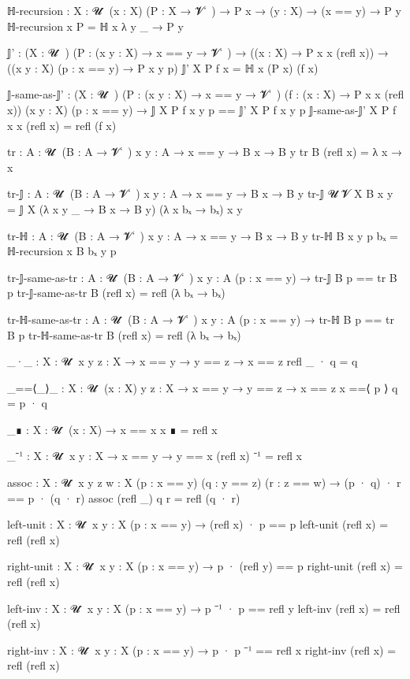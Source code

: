 ℍ-recursion : {X : 𝓤 ̇ } (x : X) (P : X → 𝓥 ̇ )
            → P x
            → (y : X) 
            → (x == y)
            → P y
ℍ-recursion x P = ℍ x λ y _ → P y 

𝕁' : (X : 𝓤 ̇ ) (P : (x y : X) → x == y → 𝓥 ̇ )
   → ((x : X) → P x x (refl x))
   → ((x y : X) (p : x == y) → P x y p) 
𝕁' X P f x = ℍ x (P x) (f x)

𝕁-same-as-𝕁' : (X : 𝓤 ̇ ) (P : (x y : X) → x == y → 𝓥 ̇ ) (f : (x : X) → P x x (refl x)) (x y : X) (p : x == y) 
            → 𝕁 X P f x y p == 𝕁' X P f x y p 
𝕁-same-as-𝕁' X P f x x (refl x) = refl (f x)

tr : {A : 𝓤 ̇ } (B : A → 𝓥 ̇ ) {x y : A}
   → x == y → B x → B y
tr B (refl x) = λ x → x

tr-𝕁 : {A : 𝓤 ̇ } (B : A → 𝓥 ̇ ) {x y : A}
     → x == y → B x → B y
tr-𝕁 {𝓤} {𝓥} {X} B {x} {y} = 𝕁 X (λ x y _ → B x → B y) (λ x bₓ → bₓ) x y

tr-ℍ : {A : 𝓤 ̇ } (B : A → 𝓥 ̇ ) {x y : A}
     → x == y → B x → B y
tr-ℍ B {x} {y} p bₓ = ℍ-recursion x B bₓ y p

tr-𝕁-same-as-tr : {A : 𝓤 ̇ } (B : A → 𝓥 ̇ ) {x y : A} (p : x == y)
                → tr-𝕁 B p == tr B p
tr-𝕁-same-as-tr B (refl x) = refl (λ bₓ → bₓ)

tr-ℍ-same-as-tr : {A : 𝓤 ̇ } (B : A → 𝓥 ̇ ) {x y : A} (p : x == y)
                → tr-ℍ B p == tr B p
tr-ℍ-same-as-tr B (refl x) = refl (λ bₓ → bₓ)

_·_ : {X : 𝓤 ̇ } {x y z : X} → x == y → y == z → x == z
refl _ · q = q

_==⟨_⟩_ : {X : 𝓤 ̇ } (x : X) {y z : X} → x == y → y == z → x == z
x ==⟨ p ⟩ q = p · q

_∎ : {X : 𝓤 ̇ } (x : X) → x == x
x ∎ = refl x

_⁻¹ : {X : 𝓤 ̇ } {x y : X} → x == y → y == x 
(refl x) ⁻¹ = refl x

assoc : {X : 𝓤 ̇ } {x y z w : X} 
        (p : x == y) (q : y == z) (r : z == w)
      → (p · q) · r == p · (q · r)
assoc (refl _) q r = refl (q · r)

left-unit : {X : 𝓤 ̇ } {x y : X} (p : x == y)
          → (refl x) · p == p 
left-unit (refl x) = refl (refl x)

right-unit : {X : 𝓤 ̇ } {x y : X} (p : x == y)
           → p · (refl y) == p
right-unit (refl x) = refl (refl x)

left-inv : {X : 𝓤 ̇ } {x y : X} (p : x == y)
         → p ⁻¹ · p == refl y
left-inv (refl x) = refl (refl x)

right-inv : {X : 𝓤 ̇ } {x y : X} (p : x == y)
          → p · p ⁻¹ == refl x 
right-inv (refl x) = refl (refl x)

